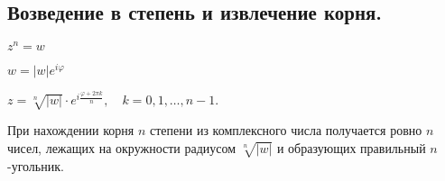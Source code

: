 \subsection{
    Возведение в степень и извлечение корня.
}

$z^n = w$

$w = |w|e^{i\varphi}$

$z = \sqrt[n]{|w|} \cdot e^{i \frac{\varphi + 2 \pi k}{n}}, \quad k = 0, 1, \ldots, n - 1.$

При нахождении корня $n$ степени из комплексного числа получается ровно $n$ чисел, лежащих на окружности радиусом $\sqrt[n]{|w|}$ и образующих правильный $n$-угольник.

